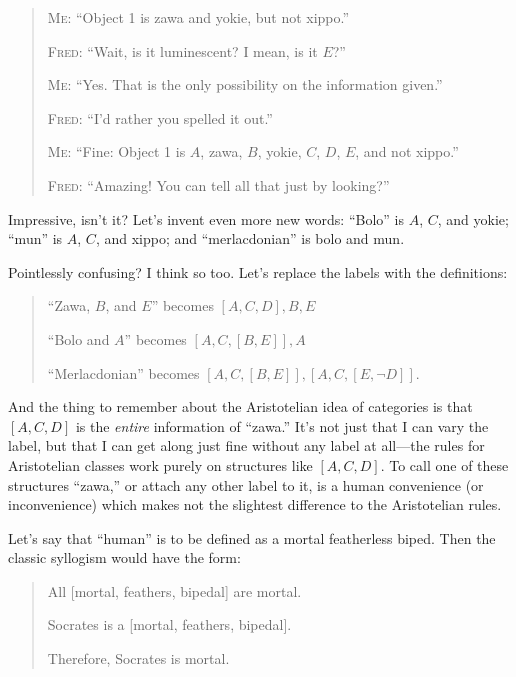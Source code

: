 \begin{quotation}
{
 \textsc{Me}: ``Object 1 is zawa and yokie, but not
xippo.''}

{
 \textsc{Fred}: ``Wait, is it luminescent? I mean, is it
$E$?''}

{
 \textsc{Me}: ``Yes. That is the only possibility on the
information given.''}

{
 \textsc{Fred}: ``I'd rather you spelled it
out.''}

{
 \textsc{Me}: ``Fine: Object 1 is $A$, zawa, $B$, yokie, $C$, $D$,
$E$, and not xippo.''}

{
 \textsc{Fred}: ``Amazing! You can tell all that just by
 looking?''}
\end{quotation}

{
 Impressive, isn't it? Let's invent
even more new words: ``Bolo'' is $A$,
$C$, and yokie; ``mun'' is $A$, $C$, and
xippo; and ``merlacdonian'' is bolo
and mun.}

{
 Pointlessly confusing? I think so too. Let's
replace the labels with the definitions:}

\begin{quotation}
{
 ``Zawa, $B$, and $E$'' becomes $[A,
C, D], B, E$}

{
 ``Bolo and $A$'' becomes $[A, C,
[B, E]], A$}

{
 ``Merlacdonian'' becomes $[A, C,
    [B, E]], [A, C, [E, \lnot D]]$.}
\end{quotation}

{
 And the thing to remember about the Aristotelian idea of
categories is that $[A, C, D]$ is the \textit{entire} information of
``zawa.'' It's not
just that I can vary the label, but that I can get along just fine
without any label at all---the rules for Aristotelian classes work
purely on structures like $[A, C, D]$. To call one of these structures
``zawa,'' or attach any other label
to it, is a human convenience (or inconvenience) which makes not the
slightest difference to the Aristotelian rules.}

{
 Let's say that
``human'' is to be defined as a
mortal featherless biped. Then the classic syllogism would have the
form:}

\begin{quotation}
{
 All [mortal, {\textlnot}feathers, bipedal] are mortal.}

{
 Socrates is a [mortal, {\textlnot}feathers, bipedal].}

{
  Therefore, Socrates is mortal.}
\end{quotation}

